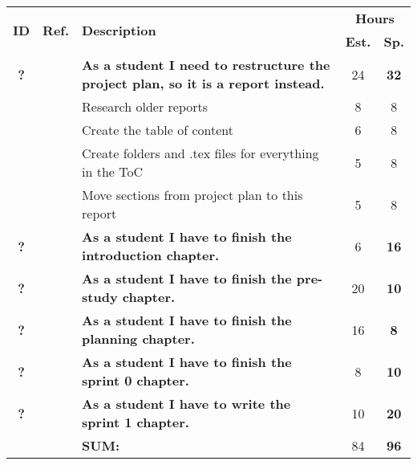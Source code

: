 \label{tab:sprint1Documentationstories}
\def\arraystretch{1.25}
 
\begin{longtable}{ccXcc}

\toprule[0.5mm]
\multirow{2}{*}{\textbf{ID}} &
\multirow{2}{*}{\textbf{Ref.}} & \multirow{2}{*}{\textbf{Description}} & \multicolumn{2}{c}{\textbf{Hours}} \\
 					& & & \textbf{Est.} & \textbf{Sp.} \\
\midrule
\textbf{?} 	&& {\bf As a student I need to restructure the project plan, so it is a report instead.}	& 	 	24	& \textbf{32} \\
			&& Research older reports 										& 8	& 8\\
			&& Create the table of content 									& 6 & 8\\
			&& Create folders and .tex files for everything in the ToC 		& 5 & 8\\
			&& Move sections from project plan to this report 				& 5 & 8\\

\textbf{?} 	&& {\bf As a student I have to finish the introduction chapter.} 							& 		6	& \textbf{16} \\

\textbf{?} 	&& {\bf As a student I have to finish the pre-study chapter.} 								& 		20	& \textbf{10} \\

\textbf{?} 	&& {\bf As a student I have to finish the planning chapter.} 								& 		16	& \textbf{8} \\

\textbf{?} 	&& {\bf As a student I have to finish the sprint 0 chapter.} 								& 		8	& \textbf{10} \\

\textbf{?} 	&& {\bf As a student I have to write the sprint 1 chapter.} 								& 		10	& \textbf{20} \\							
				
\hline
				&& \textbf{SUM:}		&		84	& \textbf{96}
 \\																			
\bottomrule[0.5mm]
\end{longtable}
